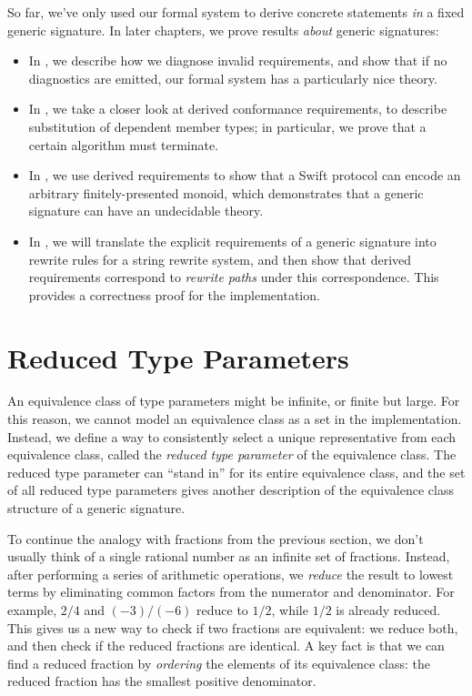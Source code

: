 \documentclass[../generics]{subfiles}
\begin{document}
So far, we've only used our formal system to derive concrete statements \emph{in} a fixed generic signature. In later chapters, we prove results \emph{about} generic signatures:
\begin{itemize}
\item In , we describe how we diagnose invalid requirements, and show that if no diagnostics are emitted, our formal system has a particularly nice theory.
\item In , we take a closer look at derived conformance requirements, to describe substitution of dependent member types; in particular, we prove that a certain algorithm must terminate.
\item In , we use derived requirements to show that a Swift protocol can encode an arbitrary finitely-presented monoid, which demonstrates that a generic signature can have an undecidable theory.
\item In , we will translate the explicit requirements of a generic signature into rewrite rules for a string rewrite system, and then show that derived requirements correspond to \emph{rewrite paths} under this correspondence. This provides a correctness proof for the implementation.
\end{itemize}

\section{Reduced Type Parameters}\label{reduced types}

An equivalence class of type parameters might be infinite, or finite but large. For this reason, we cannot model an equivalence class as a set in the implementation. Instead, we define a way to consistently select a unique representative from each equivalence class, called the \emph{reduced type parameter} of the equivalence class. The reduced type parameter can ``stand in'' for its entire equivalence class, and the set of all reduced type parameters gives another description of the equivalence class structure of a generic signature.

To continue the analogy with fractions from the previous section, we don't usually think of a single rational number as an infinite set of fractions. Instead, after performing a series of arithmetic operations, we \emph{reduce} the result to lowest terms by eliminating common factors from the numerator and denominator. For example, $2/4$ and $(-3)/(-6)$ reduce to $1/2$, while $1/2$ is already reduced. This gives us a new way to check if two fractions are equivalent: we reduce both, and then check if the reduced fractions are identical. A key fact is that we can find a reduced fraction by \emph{ordering} the elements of its equivalence class: the reduced fraction has the smallest positive denominator.
\end{document}
